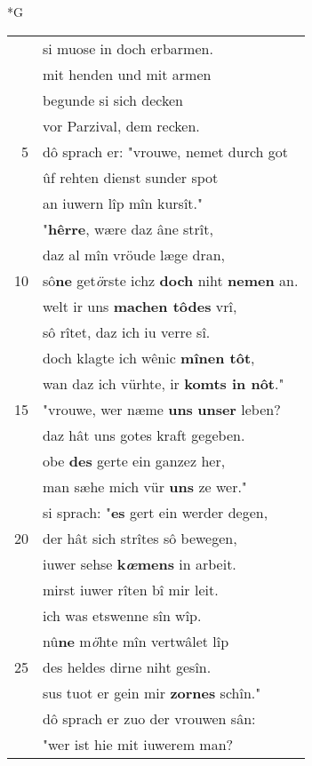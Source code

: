 \documentclass[8pt,a4paper,notitlepage]{article}
\begin{document}
\begin{table}[ht]
\begin{minipage}[t]{0.5\linewidth}
\small
\begin{center}*G
\end{center}
\begin{tabular}{rl}
 & si muose in doch erbarmen.\\ 
 & mit henden und mit armen\\ 
 & begunde si sich decken\\ 
 & vor Parzival, dem recken.\\ 
5 & dô sprach er: "vrouwe, nemet durch got\\ 
 & ûf rehten dienst sunder spot\\ 
 & an iuwern lîp mîn kursît."\\ 
 & "\textbf{hêrre}, wære daz âne strît,\\ 
 & daz al mîn vröude læge dran,\\ 
10 & sô\textbf{ne} get\textit{ö}rste ichz \textbf{doch} niht \textbf{nemen} an.\\ 
 & welt ir uns \textbf{machen tôdes} vrî,\\ 
 & sô rîtet, daz ich iu verre sî.\\ 
 & doch klagte ich wênic \textbf{mînen tôt},\\ 
 & wan daz ich vürhte, ir \textbf{komts in nôt}."\\ 
15 & "vrouwe, wer næme \textbf{uns} \textbf{unser} leben?\\ 
 & daz hât uns gotes kraft gegeben.\\ 
 & obe \textbf{des} gerte ein ganzez her,\\ 
 & man sæhe mich vür \textbf{uns} ze wer."\\ 
 & si sprach: "\textbf{es} gert ein werder degen,\\ 
20 & der hât sich strîtes sô bewegen,\\ 
 & iuwer sehse \textbf{k\textit{œ}mens} in arbeit.\\ 
 & mirst iuwer rîten bî mir leit.\\ 
 & ich was etswenne sîn wîp.\\ 
 & nû\textbf{ne} m\textit{ö}hte mîn vertwâlet lîp\\ 
25 & des heldes dirne niht gesîn.\\ 
 & sus tuot er gein mir \textbf{zornes} schîn."\\ 
 & dô sprach er zuo der vrouwen sân:\\ 
 & "wer ist hie mit iuwerem man?\\ 

\end{tabular}
\end{minipage}
\end{table}
\end{document}

